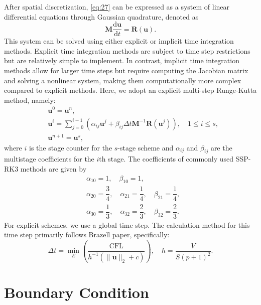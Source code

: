 \documentclass{develop-note}
\begin{document}
After spatial discretization, \autoref{eq:27} can be expressed as a system of linear differential equations through Gaussian quadrature, denoted as
\begin{equation}
  \mathbf{M}\dfrac{\mathrm{d}\mathbf{u}}{\mathrm{d}t}=\mathbf{R}(\mathbf{u}).
\end{equation}
This system can be solved using either explicit or implicit time integration methods. Explicit time integration methods are subject to time step restrictions but are relatively simple to implement. In contrast, implicit time integration methods allow for larger time steps but require computing the Jacobian matrix and solving a nonlinear system, making them computationally more complex compared to explicit methods. Here, we adopt an explicit multi-step Runge-Kutta method, namely:
\begin{equation}
  \begin{aligned}
    &\mathbf{u}^{0}=\mathbf{u}^{n},\\
    &\mathbf{u}^{i}=\sum_{j=0}^{i-1}\left(\alpha_{ij}\mathbf{u}^{j}+\beta_{ij}\Delta t\mathbf{M}^{-1}\mathbf{R}(\mathbf{u}^{j})\right),\quad 1\leqslant i\leqslant s,\\
    &\mathbf{u}^{n+1}=\mathbf{u}^{s},
  \end{aligned}
\end{equation}
where $i$ is the stage counter for the $s$-stage scheme and $\alpha_{ij}$ and $\beta_{ij}$ are the multistage coefficients for the $i$th stage. The coefficients of commonly used SSP-RK3 methods are given by
\begin{equation}
  \begin{aligned}
    &\alpha_{10}=1,\quad\beta_{10}=1,\\
    &\alpha_{20}=\dfrac{3}{4},\quad\alpha_{21}=\dfrac{1}{4},\quad\beta_{21}=\dfrac{1}{4},\\
    &\alpha_{30}=\dfrac{1}{3},\quad\alpha_{32}=\dfrac{2}{3},\quad\beta_{32}=\dfrac{2}{3}.
  \end{aligned}
\end{equation}
For explicit schemes, we use a global time step. The calculation method for this time step primarily follows Brazell\cite{brazellHighOrderDiscontinuousGalerkin2015} paper, specifically:
\begin{equation}
  \Delta t=\min_{E}\left(\dfrac{\mathrm{CFL}}{h^{-1}(\|\mathbf{u}\|_{2}+c)}\right),\quad h=\dfrac{V}{S(p+1)^{2}}.
\end{equation}

\section{Boundary Condition}
\end{document}
